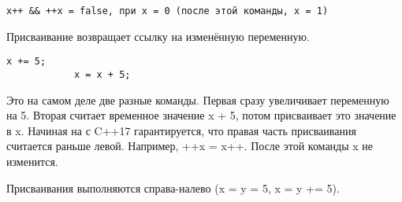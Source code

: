 \begin{example}
	
	\begin{Verbatim}[tabsize=4]
		 x++ && ++x = false, при x = 0 (после этой команды, x = 1)
	\end{Verbatim}
\end{example}

Присваивание возвращает ссылку на изменённую переменную.

\begin{note}
	
	\begin{Verbatim}[tabsize=4]
			x += 5;
			x = x + 5;
	\end{Verbatim}
\end{note}

Это на самом деле две разные команды. Первая сразу увеличивает переменную на 5. Вторая считает временное значение x + 5, потом присваивает это значение в x. Начиная на с C++17 гарантируется, что правая часть присваивания считается раньше левой. Например, ++x = x++. После этой команды x не изменится.

Присваивания выполняются справа-налево (x = y = 5, x = y += 5).
















